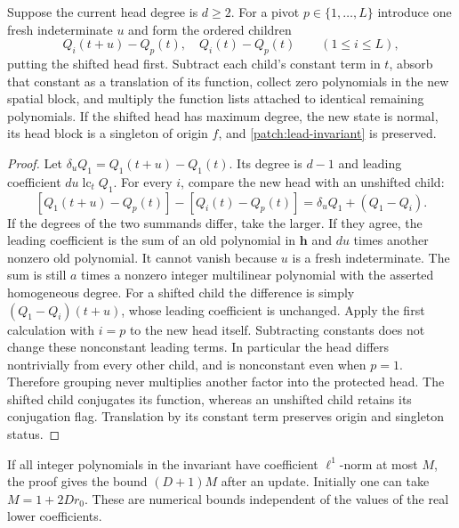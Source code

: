 \documentclass[11pt]{article}
\theoremstyle{definition}
\begin{document}
\begin{lemma}\label{patch:pet-update}
Suppose the current head degree is $d\geq2$.  For a pivot $p\in\{1,\ldots,L\}$ introduce one
fresh indeterminate $u$ and form the ordered children
\[
 Q_i(t+u)-Q_p(t),\quad Q_i(t)-Q_p(t)\qquad(1\leq i\leq L),
\]
putting the shifted head first.  Subtract each child's constant term in $t$, absorb that
constant as a translation of its function, collect zero polynomials in the new spatial block,
and multiply the function lists attached to identical remaining polynomials.
If the shifted head has maximum degree, the new state is normal, its head block is a
singleton of origin $f$, and \eqref{patch:lead-invariant} is preserved.
\end{lemma}
\begin{proof}
Let $\delta_u Q_1=Q_1(t+u)-Q_1(t)$.  Its degree is $d-1$ and leading coefficient
$d u\operatorname{lc}_tQ_1$.  For every $i$, compare the new head with an unshifted child:
\[
 [Q_1(t+u)-Q_p(t)]-[Q_i(t)-Q_p(t)]
       =\delta_uQ_1+(Q_1-Q_i).
\]
If the degrees of the two summands differ, take the larger.  If they agree, the leading
coefficient is the sum of an old polynomial in $\mathbf h$ and $du$ times another nonzero
old polynomial.  It cannot vanish because $u$ is a fresh indeterminate.  The sum is still
$a$ times a nonzero integer multilinear polynomial with the asserted homogeneous degree.
For a shifted child the difference is simply $(Q_1-Q_i)(t+u)$, whose leading coefficient is
unchanged.  Apply the first calculation with $i=p$ to the new head itself.
Subtracting constants does not change these nonconstant leading terms.
In particular the head differs nontrivially from every other child, and is nonconstant even
when $p=1$.  Therefore grouping never multiplies another factor into the protected head.
The shifted child conjugates its function, whereas an unshifted child retains its conjugation
flag.  Translation by its constant term preserves origin and singleton status.
\end{proof}
If all integer polynomials in the invariant have coefficient $\ell^1$-norm at most $M$,
the proof gives the bound $(D+1)M$ after an update.  Initially one can take
$M=1+2Dr_0$.  These are numerical bounds independent of the values of the real lower coefficients.
\end{document}
